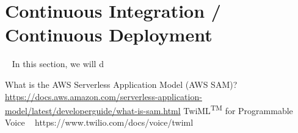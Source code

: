 \documentclass[10pt, a4paper]{article}
\begin{document}
\section{Continuous Integration / Continuous Deployment}
\label{sec:cicd}
\par ~ In this section, we will d


\begin{thebibliography}{9}
What is the AWS Serverless Application Model (AWS SAM)? ~ \url{https://docs.aws.amazon.com/serverless-application-model/latest/developerguide/what-is-sam.html}
TwiML\textsuperscript{TM} for Programmable Voice ~ https://www.twilio.com/docs/voice/twiml

\end{thebibliography}
\end{document}

